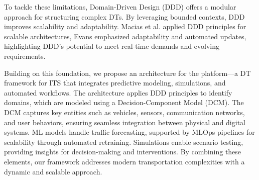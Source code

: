 To tackle these limitations, Domain-Driven Design (DDD) offers a modular approach for structuring complex DTs. By leveraging bounded contexts, DDD improves scalability and adaptability. Macias et al. \cite{macias2023architecting} applied DDD principles for scalable architectures, Evans \cite{evans2004domain} emphasized adaptability and automated updates, highlighting DDD's potential to meet real-time demands and evolving requirements.

Building on this foundation, we propose an architecture for the \digit platform—a DT framework for ITS that integrates predictive modeling, simulations, and automated workflows. The architecture applies DDD principles to identify domains, which are modeled using a Decision-Component Model (DCM). The DCM captures key entities such as vehicles, sensors, communication networks, and user behaviors, ensuring seamless integration between physical and digital systems. ML models handle traffic forecasting, supported by MLOps pipelines for scalability through automated retraining. Simulations enable scenario testing, providing insights for decision-making and interventions. By combining these elements, our framework addresses modern transportation complexities with a dynamic and scalable approach.

